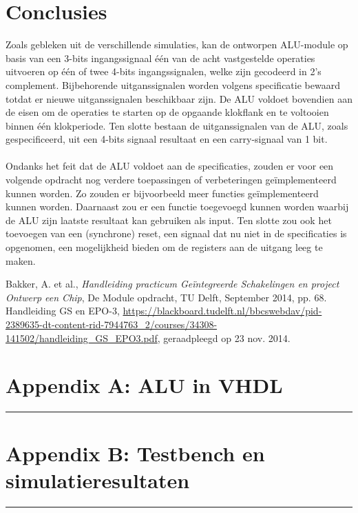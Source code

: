 \documentclass[11pt,twoside,a4paper]{article}
\begin{document}
\section{Conclusies}
Zoals gebleken uit de verschillende simulaties, kan de ontworpen ALU-module op basis van een 3-bits ingangssignaal \'e\'en van de acht vastgestelde operaties uitvoeren op \'e\'en of twee 4-bits ingangssignalen, welke zijn gecodeerd in 2's complement. Bijbehorende uitganssignalen worden volgens specificatie bewaard totdat er nieuwe uitganssignalen beschikbaar zijn. De ALU voldoet bovendien aan de eisen om de operaties te starten op de opgaande klokflank en te voltooien binnen \'e\'en klokperiode. Ten slotte bestaan de uitganssignalen van de ALU, zoals gespecificeerd, uit een 4-bits signaal resultaat en een carry-signaal van 1 bit.\\
\\
Ondanks het feit dat de ALU voldoet aan de specificaties, zouden er voor een volgende opdracht nog verdere toepassingen of verbeteringen ge\"implementeerd kunnen worden. Zo zouden er bijvoorbeeld meer functies ge\"implementeerd kunnen worden. Daarnaast zou er een functie toegevoegd kunnen worden waarbij de ALU zijn laatste resultaat kan gebruiken als input. Ten slotte zou ook het toevoegen van een (synchrone) reset, een signaal dat nu niet in de specificaties is opgenomen, een mogelijkheid bieden om de registers aan de uitgang leeg te maken.


\begin{thebibliography}{9}
Bakker, A. et al., 
\emph{Handleiding practicum Ge\"integreerde Schakelingen en project Ontwerp een Chip},
De Module opdracht,
TU Delft, 
September 2014,
pp. 68.
Handleiding GS en EPO-3, 
\url{https://blackboard.tudelft.nl/bbcswebdav/pid-2389635-dt-content-rid-7944763_2/courses/34308-141502/handleiding_GS_EPO3.pdf}, 
geraadpleegd op 23 nov. 2014.
\end{thebibliography}

\newpage
\section{Appendix A: ALU in VHDL
\label{ALU-VHDL}}

\hrule

\newpage
\section{Appendix B: Testbench en simulatieresultaten}
\label{Testbench}

\hrule

\end{document}
